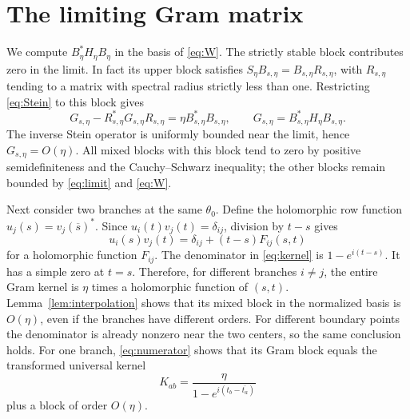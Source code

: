 \documentclass[11pt]{article}
\begin{document}
\section{The limiting Gram matrix}
We compute $B_\eta^*H_\eta B_\eta$ in the basis of \eqref{eq:W}.
The strictly stable block contributes zero in the limit. In fact its upper block satisfies
$S_\eta B_{s,\eta}=B_{s,\eta}R_{s,\eta}$, with $R_{s,\eta}$ tending to a matrix with spectral
radius strictly less than one. Restricting \eqref{eq:Stein} to this block gives
\[
G_{s,\eta}-R_{s,\eta}^*G_{s,\eta}R_{s,\eta}
=\eta B_{s,\eta}^*B_{s,\eta},\qquad G_{s,\eta}=B_{s,\eta}^*H_\eta B_{s,\eta}.
\]
The inverse Stein operator is uniformly bounded near the limit, hence $G_{s,\eta}=O(\eta)$.
All mixed blocks with this block tend to zero by positive semidefiniteness and the
Cauchy--Schwarz inequality; the other blocks remain bounded by \eqref{eq:limit} and
\eqref{eq:W}.

Next consider two branches at the same $\theta_0$. Define the holomorphic row function
$u_j(s)=v_j(\overline s)^*$. Since $u_i(t)v_j(t)=\delta_{ij}$, division by $t-s$ gives
\begin{equation}\label{eq:numerator}
u_i(s)v_j(t)=\delta_{ij}+(t-s)F_{ij}(s,t)
\end{equation}
for a holomorphic function $F_{ij}$. The denominator in \eqref{eq:kernel} is
$1-e^{i(t-s)}$. It has a simple zero at $t=s$.
Therefore, for different branches $i\ne j$, the entire Gram kernel is $\eta$ times a
holomorphic function of $(s,t)$. Lemma~\ref{lem:interpolation} shows that its mixed block
in the normalized basis is $O(\eta)$, even if the branches have different orders.
For different boundary points the denominator is already nonzero near the two centers,
so the same conclusion holds. For one branch, \eqref{eq:numerator} shows that its Gram
block equals the transformed universal kernel
\begin{equation}\label{eq:universal}
K_{ab}=\frac{\eta}{1-e^{i(t_b-\overline{t_a})}}
\end{equation}
plus a block of order $O(\eta)$.
\end{document}
